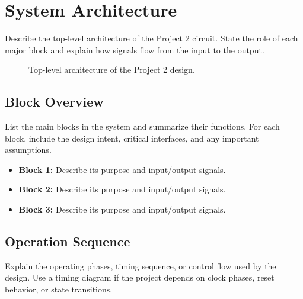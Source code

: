 \section{System Architecture}
\label{sec:system_architecture}

Describe the top-level architecture of the Project 2 circuit. State the role of
each major block and explain how signals flow from the input to the output.

\begin{figure}[H]
    \centering
    \caption{Top-level architecture of the Project 2 design.}
    \label{fig:system_architecture}
\end{figure}

\subsection{Block Overview}

List the main blocks in the system and summarize their functions. For each block,
include the design intent, critical interfaces, and any important assumptions.

\begin{itemize}
    \item \textbf{Block 1:} Describe its purpose and input/output signals.
    \item \textbf{Block 2:} Describe its purpose and input/output signals.
    \item \textbf{Block 3:} Describe its purpose and input/output signals.
\end{itemize}

\subsection{Operation Sequence}

Explain the operating phases, timing sequence, or control flow used by the design.
Use a timing diagram if the project depends on clock phases, reset behavior, or
state transitions.
